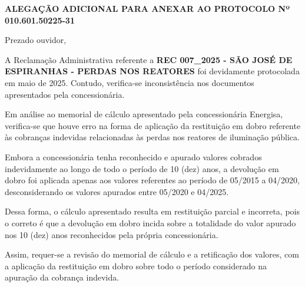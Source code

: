 \documentclass[12pt]{article}
\newcommand{\protocolo}{010.601.50225-31}
\newcommand{\reclamacao}{REC 007\_2025 - SÃO JOSÉ DE ESPIRANHAS - PERDAS NOS REATORES}
\newcommand{\data}{maio de 2025}
\begin{document}
\begin{center}\textbf{ALEGAÇÃO ADICIONAL PARA ANEXAR AO PROTOCOLO Nº \protocolo{}}\end{center}
\vspace{0.5cm}
Prezado ouvidor,

A Reclamação Administrativa referente a \textbf{\reclamacao{}} foi devidamente protocolada em \data{}. Contudo, verifica-se inconsistência nos documentos apresentados pela concessionária.

Em análise ao memorial de cálculo apresentado pela concessionária Energisa, verifica-se que houve erro na forma de aplicação da restituição em dobro referente às cobranças indevidas relacionadas às perdas nos reatores de iluminação pública.

Embora a concessionária tenha reconhecido e apurado valores cobrados indevidamente ao longo de todo o período de 10 (dez) anos, a devolução em dobro foi aplicada apenas aos valores referentes ao período de 05/2015 a 04/2020, desconsiderando os valores apurados entre 05/2020 e 04/2025.

Dessa forma, o cálculo apresentado resulta em restituição parcial e incorreta, pois o correto é que a devolução em dobro incida sobre a totalidade do valor apurado nos 10 (dez) anos reconhecidos pela própria concessionária.

Assim, requer-se a revisão do memorial de cálculo e a retificação dos valores, com a aplicação da restituição em dobro sobre todo o período considerado na apuração da cobrança indevida.
\end{document}
